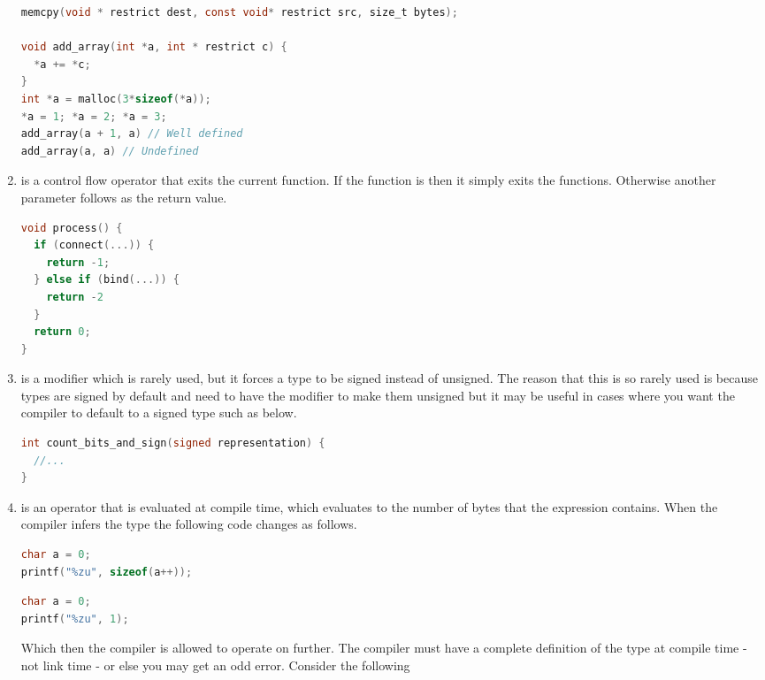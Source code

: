 \begin{enumerate}
	      \begin{lstlisting}[language=C]
memcpy(void * restrict dest, const void* restrict src, size_t bytes);

void add_array(int *a, int * restrict c) {
  *a += *c;
}
int *a = malloc(3*sizeof(*a));
*a = 1; *a = 2; *a = 3;
add_array(a + 1, a) // Well defined
add_array(a, a) // Undefined
\end{lstlisting}

	    \item {} is a control flow operator that exits the current function.
        If the function is  then it simply exits the functions.
        Otherwise another parameter follows as the return value.

	      \begin{lstlisting}[language=C]
void process() {
  if (connect(...)) {
    return -1;
  } else if (bind(...)) {
    return -2
  }
  return 0;
}
\end{lstlisting}

	    \item {} is a modifier which is rarely used, but it forces a type to be signed instead of unsigned.
        The reason that this is so rarely used is because types are signed by default and need to have the  modifier to make them unsigned but it may be useful in cases where you want the compiler to default to a signed type such as below.

	      \begin{lstlisting}[language=C]
int count_bits_and_sign(signed representation) {
  //...
}
\end{lstlisting}
	    \item {} is an operator that is evaluated at compile time, which evaluates to the number of bytes that the expression contains.
        When the compiler infers the type the following code changes as follows.
	      \begin{lstlisting}[language=C]
char a = 0;
printf("%zu", sizeof(a++));
\end{lstlisting}

	      \begin{lstlisting}[language=C]
char a = 0;
printf("%zu", 1);
\end{lstlisting}

	      Which then the compiler is allowed to operate on further.
        The compiler must have a complete definition of the type at compile time - not link time - or else you may get an odd error.
        Consider the following


\end{enumerate}
